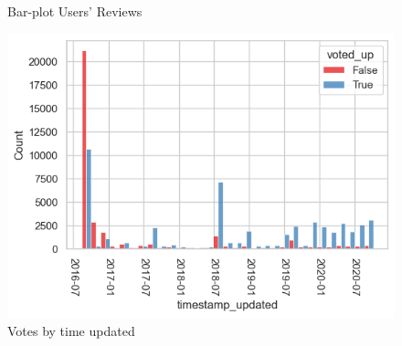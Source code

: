 \documentclass[12pt]{article}
\begin{document}
\begin{figure}[H]
\centering
{}
\hfill
{}
\caption{Bar-plot Users' Reviews}
\label{fig:bar}
\end{figure}

\begin{figure}[H]
\centering
\includegraphics[scale=0.7]{images/timestamp.png}
\caption{Votes by time updated}
\label{fig:timestamp}
\end{figure}
\end{document}
